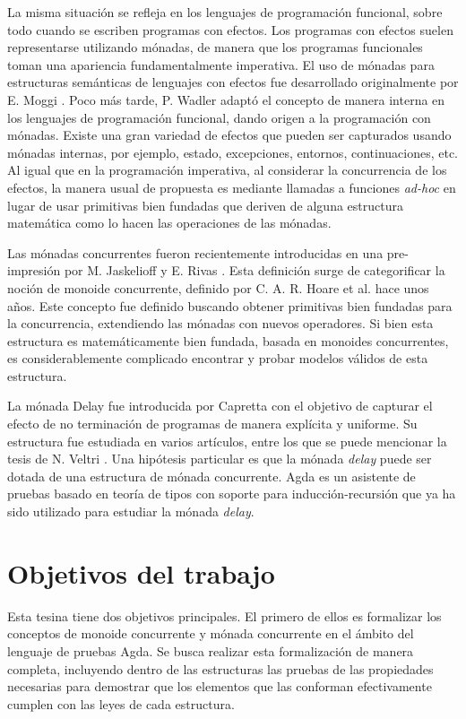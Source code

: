 La misma situación se refleja en los lenguajes de programación
funcional, sobre todo cuando se escriben programas con
efectos. Los programas con efectos suelen representarse utilizando
mónadas, de manera que los programas funcionales toman una apariencia
fundamentalmente imperativa. El uso de mónadas para estructuras semánticas de lenguajes con efectos fue desarrollado originalmente por E. Moggi \cite{moggi:1989, moggi:1991}. Poco más tarde, P. Wadler \cite{wadler:1992} adaptó el
concepto de manera interna en los lenguajes de programación funcional,
dando origen a la programación con mónadas. Existe una gran variedad
de efectos que pueden ser capturados usando mónadas internas, por
ejemplo, estado, excepciones, entornos, continuaciones, etc. Al igual que en la programación imperativa, al considerar la concurrencia de los efectos, la
manera usual de propuesta es mediante llamadas a funciones \textit{ad-hoc} en lugar de usar primitivas bien fundadas que deriven de alguna estructura
matemática como lo hacen las operaciones de las mónadas.

Las mónadas concurrentes fueron recientemente introducidas en una
pre-impresión por M. Jaskelioff y E. Rivas \cite{rivas:2019}. Esta
definición surge de categorificar la noción de monoide concurrente,
definido por C. A. R. Hoare et al. \cite{hoare:2011} hace unos
años. Este concepto fue definido buscando obtener primitivas bien fundadas para la concurrencia, extendiendo las mónadas con nuevos operadores. Si bien esta estructura es
matemáticamente bien fundada, basada en monoides concurrentes, es
considerablemente complicado encontrar y probar modelos válidos de
esta estructura. 

La mónada Delay fue introducida por Capretta \cite{capretta:2005} con el
objetivo de capturar el efecto de no terminación de programas de manera explícita y
uniforme. Su estructura fue estudiada en varios artículos, entre los
que se puede mencionar la tesis de N. Veltri \cite{veltri:2017}. Una hipótesis particular es que la mónada \textit{delay} puede ser dotada de una estructura de mónada concurrente. Agda es un asistente de pruebas basado en teoría de tipos con soporte
para inducción-recursión que ya ha sido utilizado para estudiar la
mónada \textit{delay}.

\section{Objetivos del trabajo}

Esta tesina tiene dos objetivos principales. El primero de ellos es formalizar los conceptos de monoide concurrente y mónada concurrente en el ámbito del lenguaje de pruebas Agda. Se busca realizar esta formalización de manera completa, incluyendo dentro de las estructuras las pruebas de las propiedades necesarias para demostrar que los elementos que las conforman efectivamente cumplen con las leyes de cada estructura. 

